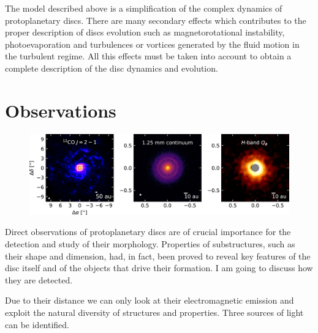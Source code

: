\documentclass[a4paper,10pt]{report}
\begin{document}
The model described above is a simplification of the complex dynamics of protoplanetary discs. 
There are many secondary effects
which contributes to the proper description of discs evolution such as magnetorotational instability, photoevaporation and 
turbulences or vortices generated by the fluid motion in the turbulent regime. All 
this effects must be taken into account to obtain a complete description of the disc dynamics and evolution.

\section{Observations}

\begin{figure}
    \begin{center}
        \includegraphics[width=\textwidth]{images/2.2.tracers.comparison/apjaba1e1f9_hr.jpg}
    \end{center}
    \caption{}
\end{figure}


Direct observations of protoplanetary discs are of crucial importance for the detection and study of their morphology.
Properties of substructures, such as their shape and dimension, had, in fact, 
been proved to reveal key features of the disc itself and
of the objects that drive their formation. I am going to discuss how they are detected.

Due to their distance we can only look at their electromagnetic emission
and exploit the natural diversity of structures and properties. 
Three sources of light can be identified.
\end{document}
